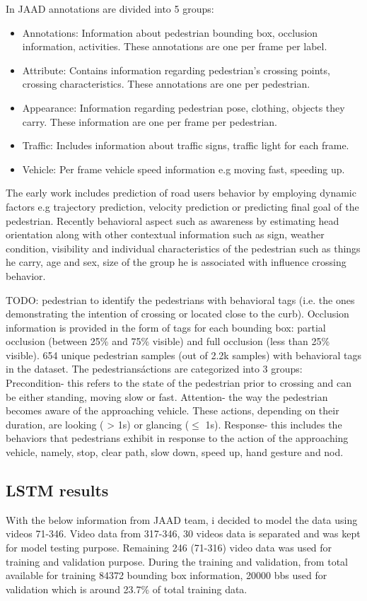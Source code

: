 In JAAD annotations are divided into 5 groups:
\begin{itemize}
	\item Annotations: Information about pedestrian bounding box, occlusion information, activities. These annotations are one per frame per label.
	\item Attribute: Contains information regarding pedestrian's crossing points, crossing characteristics. These annotations are one per pedestrian.
	\item Appearance: Information regarding pedestrian pose, clothing, objects they carry. These information are one per frame per pedestrian.
	\item Traffic: Includes information about traffic signs, traffic light for each frame.
	\item Vehicle: Per frame vehicle speed information e.g moving fast, speeding up.
\end{itemize}


The early work includes prediction of road users behavior by employing dynamic factors e.g trajectory prediction, velocity prediction or predicting final goal of the pedestrian. Recently behavioral aspect such as awareness by estimating head orientation along with other contextual information such as sign, weather condition, visibility and individual characteristics of the pedestrian such as things he carry, age and sex, size of the group he is associated with influence crossing behavior.

TODO:  pedestrian to identify the pedestrians with behavioral tags (i.e. the ones demonstrating the intention of crossing or located close to the curb). 
Occlusion information is provided in the form of tags for
each bounding box: partial occlusion (between 25\% and 75\%
visible) and full occlusion (less than 25\% visible).
 654 unique pedestrian samples (out of 2.2k samples) with behavioral tags in the
dataset. 
The
pedestrians\' actions are categorized into 3 groups: Precondition- this refers to the state of the pedestrian prior to crossing and can be either standing, moving slow or fast. Attention- the way the pedestrian becomes aware of the approaching vehicle. These actions, depending on their duration, are looking ( > 1s) or glancing ($\leq$ 1s). Response- this
includes the behaviors that pedestrians exhibit in response
to the action of the approaching vehicle, namely, stop, clear path, slow down, speed up, hand gesture and nod.

\subsection{LSTM results}
With the below information from JAAD team, i decided to model the data using videos 71-346.
Video data from 317-346, 30 videos data is separated and was kept for model testing purpose.
Remaining 246 (71-316) video data was used for training and validation purpose.
During the training and validation, from total available for training 84372 bounding box information, 20000 bbs used for validation which is around 23.7\% of total training data.

